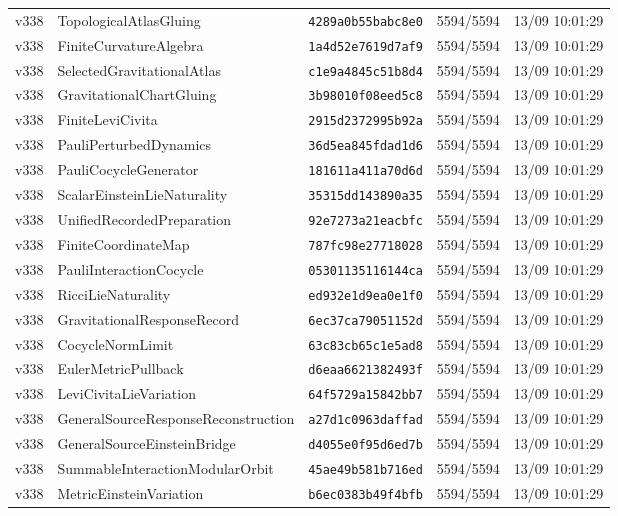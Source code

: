\documentclass[11pt]{article}
\theoremstyle{definition}\newtheorem{deriv}{Derivação}
\begin{document}
{\begin{longtable}{@{}lllll@{}}
v338 & TopologicalAtlasGluing & \texttt{4289a0b55babc8e0} & 5594/5594 & 13/09 10:01:29 \\
v338 & FiniteCurvatureAlgebra & \texttt{1a4d52e7619d7af9} & 5594/5594 & 13/09 10:01:29 \\
v338 & SelectedGravitationalAtlas & \texttt{c1e9a4845c51b8d4} & 5594/5594 & 13/09 10:01:29 \\
v338 & GravitationalChartGluing & \texttt{3b98010f08eed5c8} & 5594/5594 & 13/09 10:01:29 \\
v338 & FiniteLeviCivita & \texttt{2915d2372995b92a} & 5594/5594 & 13/09 10:01:29 \\
v338 & PauliPerturbedDynamics & \texttt{36d5ea845fdad1d6} & 5594/5594 & 13/09 10:01:29 \\
v338 & PauliCocycleGenerator & \texttt{181611a411a70d6d} & 5594/5594 & 13/09 10:01:29 \\
v338 & ScalarEinsteinLieNaturality & \texttt{35315dd143890a35} & 5594/5594 & 13/09 10:01:29 \\
v338 & UnifiedRecordedPreparation & \texttt{92e7273a21eacbfc} & 5594/5594 & 13/09 10:01:29 \\
v338 & FiniteCoordinateMap & \texttt{787fc98e27718028} & 5594/5594 & 13/09 10:01:29 \\
v338 & PauliInteractionCocycle & \texttt{05301135116144ca} & 5594/5594 & 13/09 10:01:29 \\
v338 & RicciLieNaturality & \texttt{ed932e1d9ea0e1f0} & 5594/5594 & 13/09 10:01:29 \\
v338 & GravitationalResponseRecord & \texttt{6ec37ca79051152d} & 5594/5594 & 13/09 10:01:29 \\
v338 & CocycleNormLimit & \texttt{63c83cb65c1e5ad8} & 5594/5594 & 13/09 10:01:29 \\
v338 & EulerMetricPullback & \texttt{d6eaa6621382493f} & 5594/5594 & 13/09 10:01:29 \\
v338 & LeviCivitaLieVariation & \texttt{64f5729a15842bb7} & 5594/5594 & 13/09 10:01:29 \\
v338 & GeneralSourceResponseReconstruction & \texttt{a27d1c0963daffad} & 5594/5594 & 13/09 10:01:29 \\
v338 & GeneralSourceEinsteinBridge & \texttt{d4055e0f95d6ed7b} & 5594/5594 & 13/09 10:01:29 \\
v338 & SummableInteractionModularOrbit & \texttt{45ae49b581b716ed} & 5594/5594 & 13/09 10:01:29 \\
v338 & MetricEinsteinVariation & \texttt{b6ec0383b49f4bfb} & 5594/5594 & 13/09 10:01:29 \\

\end{longtable}}
\end{document}
